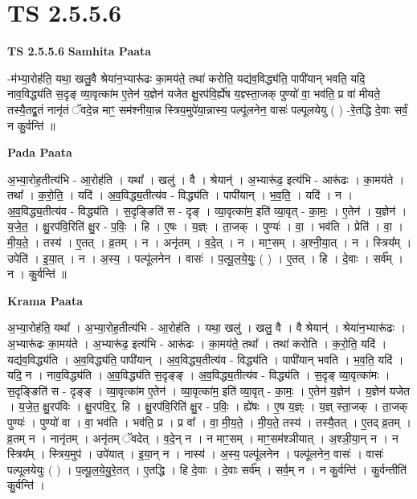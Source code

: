 \documentclass[17pt]{extarticle}
\begin{document}
\section*{ TS 2.5.5.6 }

\textbf{TS 2.5.5.6 } \newline
\textbf{Samhita Paata} \newline

-म॑भ्या॒रोह॑ति॒ यथा॒ खलु॒वै श्रेया॑न॒भ्यारू॑ढः का॒मय॑ते॒ तथा॑ करोति॒ यद्य॑व॒विद्ध्य॑ति॒ पापी॑यान् भवति॒ यदि॒ नाव॒विद्ध्य॑ति स॒दृङ् व्या॒वृत्का॑म ए॒तेन॑ य॒ज्ञेन॑ यजेत क्षु॒रप॑वि॒र्ह्ये॑ष य॒ज्ञ्स्ता॒जक् पुण्यो॑ वा॒ भव॑ति॒ प्र वा॑ मीयते॒ तस्यै॒तद्व्र॒तं नानृ॑तं ॅवदे॒न्न माꣳ॒॒ सम॑श्नीया॒न्न स्त्रिय॒मुपे॑या॒न्नास्य॒ पल्पू॑लनेन॒ वासः॑ पल्पूलयेयु ( ) -रे॒तद्धि दे॒वाः सर्वं॒ न कु॒र्वन्ति॑ ॥ \newline

\textbf{Pada Paata} \newline

अ॒भ्या॒रोह॒तीत्य॑भि - आ॒रोह॑ति । यथा᳚ । खलु॑ । वै । श्रेयान्॑ । अ॒भ्यारू॑ढ॒ इत्य॑भि - आरू॑ढः । का॒मय॑ते । तथा᳚ । क॒रो॒ति॒ । यदि॑ । अ॒व॒विद्ध्य॒तीत्य॑व - विद्ध्य॑ति । पापी॑यान् । भ॒व॒ति॒ । यदि॑ । न । अ॒व॒विद्ध्य॒तीत्य॑व - विद्ध्य॑ति । स॒दृङ्ङिति॑ स - दृङ् । व्या॒वृत्का॑म॒ इति॑ व्या॒वृत् - का॒मः॒ । ए॒तेन॑ । य॒ज्ञेन॑ । य॒जे॒त॒ । क्षु॒रप॑वि॒रिति॑ क्षु॒र - प॒विः॒ । हि । ए॒षः । य॒ज्ञ्ः । ता॒जक् । पुण्यः॑ । वा॒ । भव॑ति । प्रेति॑ । वा॒ । मी॒य॒ते॒ । तस्य॑ । ए॒तत् । व्र॒तम् । न । अनृ॑तम् । व॒दे॒त् । न । माꣳ॒॒सम् । अ॒श्नी॒या॒त् । न । स्त्रिय᳚म् । उपेति॑ । इ॒या॒त् । न । अ॒स्य॒ । पल्पू॑लनेन । वासः॑ । प॒ल्पू॒ल॒ये॒युः॒ ( ) । ए॒तत् । हि । दे॒वाः । सर्व᳚म् । न । कु॒र्वन्ति॑ ॥  \newline


\textbf{Krama Paata} \newline

अ॒भ्या॒रोह॑ति॒ यथा᳚ । अ॒भ्या॒रोह॒तीत्य॑भि - आ॒रोह॑ति । यथा॒ खलु॑ । खलु॒ वै । वै श्रेयान्॑ । श्रेया॑न॒भ्यारू॑ढः । अ॒भ्यारू॑ढः का॒मय॑ते । अ॒भ्यारू॑ढ॒ इत्य॑भि - आरू॑ढः । का॒मय॑ते॒ तथा᳚ । तथा॑ करोति । क॒रो॒ति॒ यदि॑ । यद्य॑व॒विद्ध्य॑ति । अ॒व॒विद्ध्य॑ति॒ पापी॑यान् । अ॒व॒विद्ध्य॒तीत्य॑व - विद्ध्य॑ति । पापी॑यान् भवति । भ॒व॒ति॒ यदि॑ । यदि॒ न । नाव॒विद्ध्य॑ति । अ॒व॒विद्ध्य॑ति स॒दृङ्ङ् । अ॒व॒विद्ध्य॒तीत्य॑व - विद्ध्य॑ति । स॒दृङ् व्या॒वृत्का॑मः । स॒दृङ्ङिति॑ स - दृङ्ङ् । व्या॒वृत्का॑म ए॒तेन॑ । व्या॒वृत्का॑म॒ इति॑ व्या॒वृत् - का॒मः॒ । ए॒तेन॑ य॒ज्ञेन॑ । य॒ज्ञेन॑ यजेत । य॒जे॒त॒ क्षु॒रप॑विः । क्षु॒रप॑वि॒र्॒. हि । क्षु॒रप॑वि॒रिति॑ क्षु॒र - प॒विः॒ । ह्ये॑षः । ए॒ष य॒ज्ञ्ः । य॒ज्ञ् स्ता॒जक् । ता॒जक् पुण्यः॑ । पुण्यो॑ वा । वा॒ भव॑ति । भव॑ति॒ प्र । प्र वा᳚ । वा॒ मी॒य॒ते॒ । मी॒य॒ते॒ तस्य॑ । तस्यै॒तत् । ए॒तद् व्र॒तम् । व्र॒तम् न । नानृ॑तम् । अनृ॑तम् ॅवदेत् । व॒दे॒न् न । न माꣳ॒॒सम् । माꣳ॒॒सम॑श्ञीयात् । अ॒श्ञी॒या॒न् न । न स्त्रिय᳚म् । स्त्रिय॒मुप॑ । उपे॑यात् । इ॒या॒न् न । नास्य॑ । अ॒स्य॒ पल्पू॑लनेन । पल्पू॑लनेन॒ वासः॑ । वासः॑ पल्पूलयेयुः ( ) । प॒ल्पू॒ल॒ये॒यु॒रे॒तत् । ए॒तद्धि । हि दे॒वाः । दे॒वाः सर्व᳚म् । सर्व॒म् न । न कु॒र्वन्ति॑ । कु॒र्वन्तीति॑ कु॒र्वन्ति॑ । \newline
\end{document}
